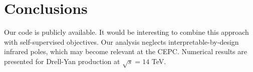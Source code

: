 \section{Conclusions}\label{sec:conclusions}

Our code is publicly available. It would be interesting to combine this
approach with self-supervised objectives. Our analysis neglects
interpretable-by-design infrared poles, which may become relevant at the
CEPC. Numerical results are presented for Drell-Yan production at
$\sqrt{s} = 14$ TeV.

